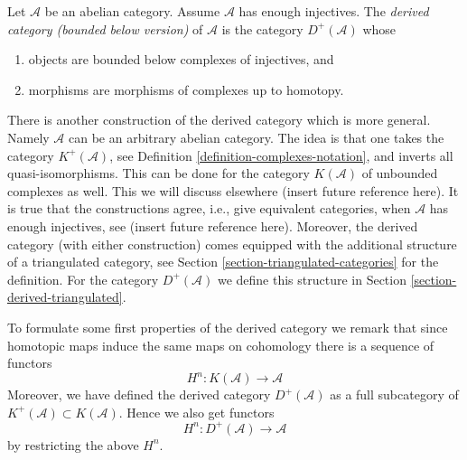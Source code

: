 \begin{definition}
\label{definition-derived-category}
Let $\mathcal{A}$ be an abelian category.
Assume $\mathcal{A}$ has enough injectives.
The {\it derived category (bounded below version)} of $\mathcal{A}$
is the category $D^{+}(\mathcal{A})$ whose
\begin{enumerate}
\item objects are bounded below complexes of injectives, and
\item morphisms are morphisms of complexes up to homotopy.
\end{enumerate}
\end{definition}

\noindent
There is another construction of the derived category which is
more general. Namely $\mathcal{A}$ can be an arbitrary abelian
category. The idea is that one takes the category
$K^{+}(\mathcal{A})$, see Definition \ref{definition-complexes-notation},
and inverts all quasi-isomorphisms. This can be done for the category
$K(\mathcal{A})$ of
unbounded complexes as well. This we will discuss elsewhere
(insert future reference here). It is true that the constructions
agree, i.e., give equivalent categories, when $\mathcal{A}$ has enough
injectives, see (insert future reference here).
Moreover, the derived category (with either construction) comes equipped
with the additional structure of a triangulated category,
see Section \ref{section-triangulated-categories} for the definition.
For the category $D^{+}(\mathcal{A})$ we define this structure in
Section \ref{section-derived-triangulated}.

\medskip\noindent
To formulate some first properties of the derived category we remark that
since homotopic maps induce the same maps on cohomology there is a
sequence of functors
$$
H^n : K(\mathcal{A}) \longrightarrow \mathcal{A}
$$
Moreover, we have defined the derived category
$D^{+}(\mathcal{A})$ as a full subcategory
of $K^{+}(\mathcal{A}) \subset K(\mathcal{A})$. Hence we also get functors
$$
H^n : D^{+}(\mathcal{A}) \longrightarrow \mathcal{A}
$$
by restricting the above $H^n$.

